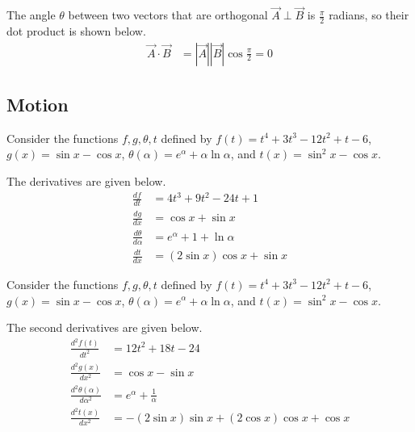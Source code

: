 \begin{answer}
	The angle $\theta$ between two vectors that are orthogonal $\vec{A} \perp \vec{B}$ is $\frac{\pi}{2}$ radians, so their dot product is shown below.
	\begin{align}
		\vec{A} \cdot \vec{B} & = \left|\vec{A}\right| \left|\vec{B}\right| \cos \frac{\pi}{2} = 0
	\end{align}
\end{answer}

\subsection{Motion}

\begin{answer}
	Consider the functions $f,g,\theta,t$ defined by $f(t) = t^4 + 3t^3 - 12t^2 + t - 6$, $g(x) = \sin x - \cos x$, $\theta(\alpha) = e^\alpha + \alpha \ln \alpha$, and $t(x) = \sin^2x - \cos x$.

	The derivatives are given below.
	\begin{align*}
		\frac{df}{dt}           & = 4t^3 + 9t^2 - 24t + 1                \\
		\frac{dg}{dx}           & = \cos x + \sin x                      \\
		\frac{d\theta}{d\alpha} & = e^\alpha + 1 + \ln \alpha            \\
		\frac{dt}{dx}           & = \left(2 \sin x\right)\cos x + \sin x
	\end{align*}
\end{answer}

\begin{answer}
	Consider the functions $f,g,\theta,t$ defined by $f(t) = t^4 + 3t^3 - 12t^2 + t - 6$, $g(x) = \sin x - \cos x$, $\theta(\alpha) = e^\alpha + \alpha \ln \alpha$, and $t(x) = \sin^2x - \cos x$.

	The second derivatives are given below.
	\begin{align*}
		\frac{d^2f(t)}{dt^2}                & = 12t^2 + 18t - 24                                                   \\
		\frac{d^2g(x)}{dx^2}                & = \cos x - \sin x                                                    \\
		\frac{d^2\theta(\alpha)}{d\alpha^2} & = e^\alpha + \frac{1}{\alpha}                                        \\
		\frac{d^2t(x)}{dx^2}                & = -\left(2\sin x\right)\sin x + \left(2 \cos x\right)\cos x + \cos x
	\end{align*}
\end{answer}

